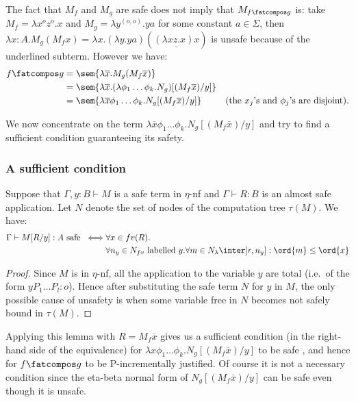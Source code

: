 The fact that $M_f$ and $M_g$ are safe does not imply that $M_{f\fatcompos g}$ is: take $M_f = \lambda x^o z^o.x$ and $M_g = \lambda y^{(o,o)} . y a$ for some constant $a\in \Sigma$, then $\lambda x:A . M_g (M_f x) = \lambda x . (\lambda y . y a) ( \underline{(\lambda x z.x) x} )$ is unsafe because of the underlined subterm. However we have:
\begin{align*}
f\fatcompos g &= \sem{\lambda \overline{x} . M_g (M_f  \overline{x})} \\
 &= \sem{\lambda \overline{x} . (\lambda \phi_1\ldots \phi_k . N_g) [(M_f \overline{x}) / y]} \\
&= \sem{\lambda \overline{x} \phi_1 \dots \phi_k. N_g [(M_f  \overline{x}) / y]}
& \mbox{(the $x_j$'s and $\phi_j$'s are disjoint)}.
\end{align*}

We now concentrate on the term  $\lambda \overline{x} \phi_1 \dots \phi_k. N_g [(M_f  \overline{x}) / y]$ and try to find a sufficient condition guaranteeing its safety.
\subsubsection{A sufficient condition}
\begin{lemma}
Suppose that $\Gamma,y:B \vdash M$ is a safe term in $\eta$-nf and $\Gamma \vdash R : B$ is an almost safe application. Let $N$ denote the set of nodes of the computation tree $\tau(M)$. We have:
\begin{align*}
\Gamma \vdash M[R/y] :A \mbox{ safe }
\iff&  \forall x \in fv(R) . \\
    & \forall n_y \in N_{fv} \mbox{ labelled $y$}.
      \forall m \in N_{\lambda} \inter ]r,n_y] : \ord{m} \leq \ord{x}
\end{align*}
\end{lemma}
\begin{proof}
Since $M$ is in $\eta$-nf, all the application to the variable $y$ are total (i.e.~of the form $y P_1 \ldots P_l :o$). Hence after substituting the safe term $N$ for $y$ in $M$, the only possible cause of unsafety is when
some variable free in $N$ becomes not safely bound in $\tau(M)$.
\end{proof}

Applying this lemma with $R= M_f \overline{x}$ gives us a sufficient condition (in the right-hand side of the equivalence)
for $\lambda x \phi_1 \dots \phi_k. N_g [(M_f \overline{x}) / y]$ to be safe , and hence for $f\fatcompos g$ to be P-incrementally justified. Of course it is not a necessary condition since the
eta-beta normal form of  $N_g[(M_f \overline{x}) /y]$ can be safe even though it is unsafe.

